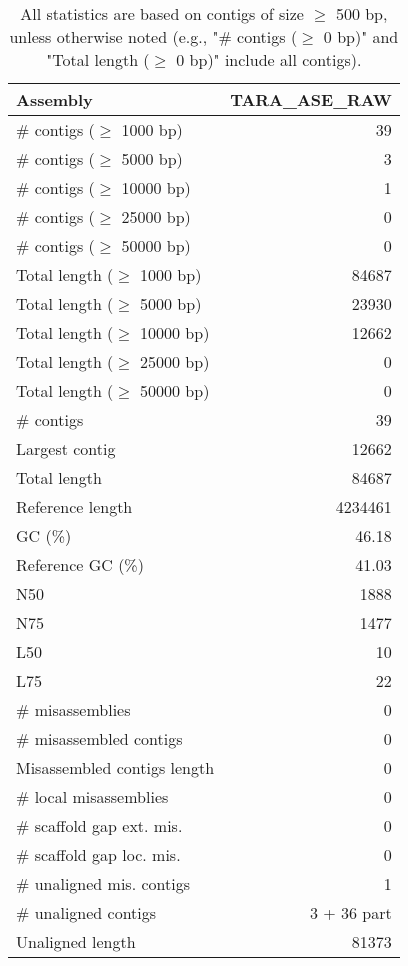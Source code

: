 \documentclass[12pt,a4paper]{article}
\begin{document}
\begin{table}[ht]
\begin{center}
\caption{All statistics are based on contigs of size $\geq$ 500 bp, unless otherwise noted (e.g., "\# contigs ($\geq$ 0 bp)" and "Total length ($\geq$ 0 bp)" include all contigs).}
\begin{tabular}{|l*{1}{|r}|}
\hline
Assembly & TARA\_ASE\_RAW \\ \hline
\# contigs ($\geq$ 1000 bp) & 39 \\ \hline
\# contigs ($\geq$ 5000 bp) & 3 \\ \hline
\# contigs ($\geq$ 10000 bp) & 1 \\ \hline
\# contigs ($\geq$ 25000 bp) & 0 \\ \hline
\# contigs ($\geq$ 50000 bp) & 0 \\ \hline
Total length ($\geq$ 1000 bp) & 84687 \\ \hline
Total length ($\geq$ 5000 bp) & 23930 \\ \hline
Total length ($\geq$ 10000 bp) & 12662 \\ \hline
Total length ($\geq$ 25000 bp) & 0 \\ \hline
Total length ($\geq$ 50000 bp) & 0 \\ \hline
\# contigs & 39 \\ \hline
Largest contig & 12662 \\ \hline
Total length & 84687 \\ \hline
Reference length & 4234461 \\ \hline
GC (\%) & 46.18 \\ \hline
Reference GC (\%) & 41.03 \\ \hline
N50 & 1888 \\ \hline
N75 & 1477 \\ \hline
L50 & 10 \\ \hline
L75 & 22 \\ \hline
\# misassemblies & 0 \\ \hline
\# misassembled contigs & 0 \\ \hline
Misassembled contigs length & 0 \\ \hline
\# local misassemblies & 0 \\ \hline
\# scaffold gap ext. mis. & 0 \\ \hline
\# scaffold gap loc. mis. & 0 \\ \hline
\# unaligned mis. contigs & 1 \\ \hline
\# unaligned contigs & 3 + 36 part \\ \hline
Unaligned length & 81373 \\ \hline

\end{tabular}
\end{center}
\end{table}
\end{document}
